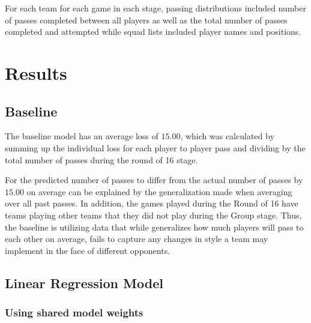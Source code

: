 \documentclass[11pt,letterpaper]{article}
\begin{document}
For each team for each game in each stage, passing distributions included number of passes completed between all players as well as the total number of passes completed and attempted while squad lists included player names and positions.

\section{Results}




\subsection{Baseline}
The baseline model has an average loss of $15.00$, which was calculated by summing up the individual loss for each player to player pass and dividing by the total number of passes during the round of 16 stage. 

For the predicted number of passes to differ from the actual number of passes by $15.00$ on average can be explained by the generalization made when averaging over all past passes. In addition, the games played during the Round of 16 have teams playing other teams that they did not play during the Group stage. Thus, the baseline is utilizing data that while generalizes how much players will pass to each other on average, fails to capture any changes in style a team may implement in the face of different opponents. 

\subsection{Linear Regression Model}
\subsubsection{Using shared model weights}
\end{document}
